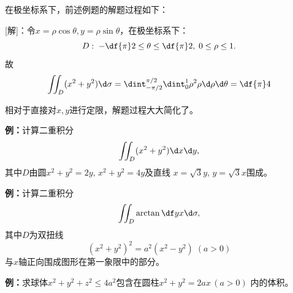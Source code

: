在极坐标系下，前述例题的解题过程如下：

[解]：令$x=\rho\cos\theta,y=\rho\sin\theta$，在极坐标系下：
$$D:\;-\df{\pi}2\leq\theta\leq\df{\pi}2,
\;0\leq\rho\leq1.$$
故
$$\iint_D(x^2+y^2)\d\sigma
=\dint_{-\pi/2}^{\pi/2}\dint_0^1\rho^2\rho\d\rho\d\theta
=\df{\pi}4
$$
\fin

相对于直接对$x,y$进行定限，解题过程大大简化了。

{\bf 例：}计算二重积分
$$\iint_D(x^2+y^2)\d x\d y,$$
其中$D$由圆$x^2+y^2=2y,\,x^2+y^2=4y$及直线
$x=\sqrt 3y,\,y=\sqrt 3x$围成。

{\bf 例：}计算二重积分
$$\iint_D\arctan\df yx\d\sigma,$$
其中$D$为双扭线
$$(x^2+y^2)^2=a^2(x^2-y^2)\;(a>0)$$
与$x$轴正向围成图形在第一象限中的部分。

\begin{center}
\end{center}

{\bf 例：}求球体$x^2+y^2+z^2\leq 4a^2$包含在圆柱$x^2+y^2=2ax\,(a>0)$
内的体积。

